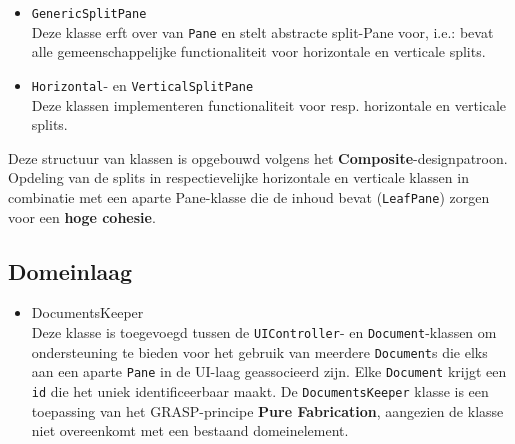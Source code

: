 \documentclass[12pt]{article}
\begin{document}
\begin{itemize}
\begin{itemize}
		\item \texttt{GenericSplitPane}\\
		Deze klasse erft over van \texttt{Pane} en stelt abstracte split-Pane voor, i.e.: bevat alle gemeenschappelijke functionaliteit voor horizontale en verticale splits.
		
		\item \texttt{Horizontal}- en \texttt{VerticalSplitPane}\\
		Deze klassen implementeren functionaliteit voor resp. horizontale en verticale splits.
	\end{itemize}
	Deze structuur van klassen is  opgebouwd volgens het \textbf{Composite}-designpatroon. Opdeling van de splits in respectievelijke horizontale en verticale klassen in combinatie met een aparte Pane-klasse die de inhoud bevat (\texttt{LeafPane}) zorgen voor een \textbf{hoge cohesie}.
\end{itemize}

\subsection{Domeinlaag}
\begin{itemize}
	\item DocumentsKeeper\\
	Deze klasse is toegevoegd tussen de \texttt{UIController}- en \texttt{Document}-klassen om ondersteuning te bieden voor het gebruik van meerdere \texttt{Document}s die elks aan een aparte \texttt{Pane} in de UI-laag geassocieerd zijn. Elke \texttt{Document} krijgt een \texttt{id} die het uniek identificeerbaar maakt. De \texttt{DocumentsKeeper} klasse is een toepassing van het GRASP-principe \textbf{Pure Fabrication}, aangezien de klasse niet overeenkomt met een bestaand domeinelement.
\end{itemize}
\end{document}
